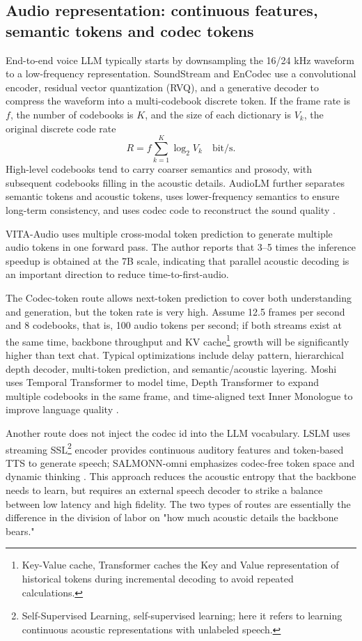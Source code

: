 \documentclass[UTF8,fontset=none,a4paper,10pt]{ctexart}
\begin{document}
\subsection{Audio representation: continuous features, semantic tokens and codec tokens}

End-to-end voice LLM typically starts by downsampling the 16/24 kHz waveform to a low-frequency representation. SoundStream and EnCodec use a convolutional encoder, residual vector quantization (RVQ), and a generative decoder to compress the waveform into a multi-codebook discrete token\cite{zeghidour2021soundstream,defossez2022encodec}. If the frame rate is $f$, the number of codebooks is $K$, and the size of each dictionary is $V_k$, the original discrete code rate
\begin{equation}
R=f\sum_{k=1}^{K}\log_2V_k\quad\text{bit/s}.
\end{equation}
High-level codebooks tend to carry coarser semantics and prosody, with subsequent codebooks filling in the acoustic details. AudioLM further separates semantic tokens and acoustic tokens, uses lower-frequency semantics to ensure long-term consistency, and uses codec code to reconstruct the sound quality \cite{borsos2022audiolm}.

VITA-Audio uses multiple cross-modal token prediction to generate multiple audio tokens in one forward pass. The author reports that 3--5 times the inference speedup\cite{long2025vitaaudio} is obtained at the 7B scale, indicating that parallel acoustic decoding is an important direction to reduce time-to-first-audio.

The Codec-token route allows next-token prediction to cover both understanding and generation, but the token rate is very high. Assume 12.5 frames per second and 8 codebooks, that is, 100 audio tokens per second; if both streams exist at the same time, backbone throughput and KV cache\footnote{Key-Value cache, Transformer caches the Key and Value representation of historical tokens during incremental decoding to avoid repeated calculations. } growth will be significantly higher than text chat. Typical optimizations include delay pattern, hierarchical depth decoder, multi-token prediction, and semantic/acoustic layering. Moshi uses Temporal Transformer to model time, Depth Transformer to expand multiple codebooks in the same frame, and time-aligned text Inner Monologue to improve language quality \cite{defossez2024moshi}.

Another route does not inject the codec id into the LLM vocabulary. LSLM uses streaming SSL\footnote{Self-Supervised Learning, self-supervised learning; here it refers to learning continuous acoustic representations with unlabeled speech. } encoder provides continuous auditory features and token-based TTS to generate speech; SALMONN-omni emphasizes codec-free token space and dynamic thinking \cite{ma2025lslm,yu2025salmonnomni}. This approach reduces the acoustic entropy that the backbone needs to learn, but requires an external speech decoder to strike a balance between low latency and high fidelity. The two types of routes are essentially the difference in the division of labor on "how much acoustic details the backbone bears."
\end{document}
